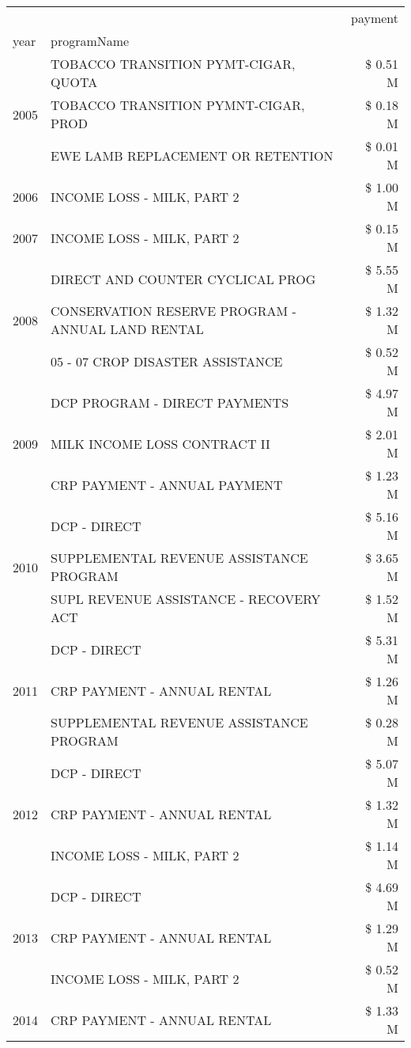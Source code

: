 \begin{tabular}{llr}
\toprule
 &  & payment \\
year & programName &  \\
\midrule
\multirow[t]{3}{*}{2005} & TOBACCO TRANSITION PYMT-CIGAR, QUOTA & \$ 0.51 M \\
 & TOBACCO TRANSITION PYMNT-CIGAR, PROD & \$ 0.18 M \\
 & EWE LAMB REPLACEMENT OR RETENTION & \$ 0.01 M \\
\cline{1-3}
2006 & INCOME LOSS - MILK, PART 2 & \$ 1.00 M \\
\cline{1-3}
2007 & INCOME LOSS - MILK, PART 2 & \$ 0.15 M \\
\cline{1-3}
\multirow[t]{3}{*}{2008} & DIRECT AND COUNTER CYCLICAL PROG & \$ 5.55 M \\
 & CONSERVATION RESERVE PROGRAM - ANNUAL LAND RENTAL & \$ 1.32 M \\
 & 05 - 07 CROP DISASTER ASSISTANCE & \$ 0.52 M \\
\cline{1-3}
\multirow[t]{3}{*}{2009} & DCP PROGRAM - DIRECT PAYMENTS & \$ 4.97 M \\
 & MILK INCOME LOSS CONTRACT II & \$ 2.01 M \\
 & CRP PAYMENT - ANNUAL PAYMENT & \$ 1.23 M \\
\cline{1-3}
\multirow[t]{3}{*}{2010} & DCP - DIRECT & \$ 5.16 M \\
 & SUPPLEMENTAL REVENUE ASSISTANCE PROGRAM & \$ 3.65 M \\
 & SUPL REVENUE ASSISTANCE - RECOVERY ACT & \$ 1.52 M \\
\cline{1-3}
\multirow[t]{3}{*}{2011} & DCP - DIRECT & \$ 5.31 M \\
 & CRP PAYMENT - ANNUAL RENTAL & \$ 1.26 M \\
 & SUPPLEMENTAL REVENUE ASSISTANCE PROGRAM & \$ 0.28 M \\
\cline{1-3}
\multirow[t]{3}{*}{2012} & DCP - DIRECT & \$ 5.07 M \\
 & CRP PAYMENT - ANNUAL RENTAL & \$ 1.32 M \\
 & INCOME LOSS - MILK, PART 2 & \$ 1.14 M \\
\cline{1-3}
\multirow[t]{3}{*}{2013} & DCP - DIRECT & \$ 4.69 M \\
 & CRP PAYMENT - ANNUAL RENTAL & \$ 1.29 M \\
 & INCOME LOSS - MILK, PART 2 & \$ 0.52 M \\
\cline{1-3}
\multirow[t]{3}{*}{2014} & CRP PAYMENT - ANNUAL RENTAL & \$ 1.33 M \\

\end{tabular}
